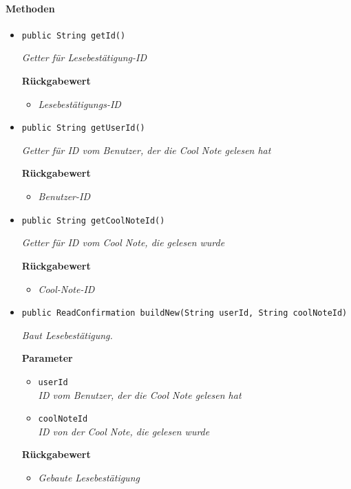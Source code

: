     \paragraph*{Methoden}
     \begin{itemize}
     	\item{\texttt{public String getId()}}
     	
     	\textit{Getter für Lesebestätigung-ID}
     	
     	\textbf{Rückgabewert}
     	\begin{itemize}
     		\item\textit{Lesebestätigungs-ID}
     	\end{itemize}
     
     \item{\texttt{public String getUserId()}}
     	
     	\textit{Getter für ID vom Benutzer, der die Cool Note gelesen hat}
     	
     	\textbf{Rückgabewert}
     	\begin{itemize}
     		\item\textit{Benutzer-ID}
     	\end{itemize}
     
     \item{\texttt{public String getCoolNoteId()}}
     	
     	\textit{Getter für ID vom Cool Note, die gelesen wurde}
     	
     	\textbf{Rückgabewert}
     	\begin{itemize}
     		\item\textit{Cool-Note-ID}
     	\end{itemize}
     
     \item{\texttt{public ReadConfirmation buildNew(String userId, String coolNoteId)}}
     	
     	\textit{Baut Lesebestätigung.}
     	
     	\textbf{Parameter}
     	\begin{itemize}
     		\item\texttt{userId}\\
     		\textit{ID vom Benutzer, der die Cool Note gelesen hat}
     		\item\texttt{coolNoteId}\\
     		\textit{ID von der Cool Note, die gelesen wurde}
     	\end{itemize}
     
     	\textbf{Rückgabewert}
     	\begin{itemize}
     		\item\textit{Gebaute Lesebestätigung}
     	\end{itemize}
     \end{itemize}
